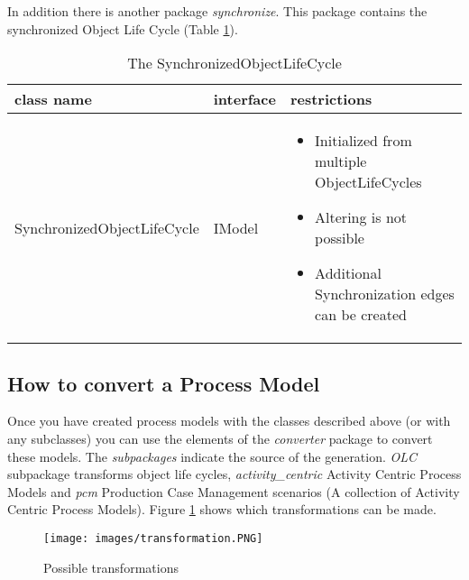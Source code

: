 In addition there is another package \textit{synchronize}. This package contains the synchronized Object Life Cycle (Table \ref{tbl:synchronize_olc}).

\begin{table}[h]
	\centering
	\begin{tabular}{|l|l|p{8cm}|}
		\hline
		\textbf{class name} & \textbf{interface} & \textbf{restrictions}\\
		\hline
		SynchronizedObjectLifeCycle & IModel & \begin{itemize}
					\item Initialized from multiple ObjectLifeCycles
					\item Altering is not possible
					\item Additional Synchronization edges can be created
				\end{itemize}\\
		\hline
	\end{tabular}
	\caption{The SynchronizedObjectLifeCycle}
	\label{tbl:synchronize_olc}
\end{table}

\subsection{How to convert a Process Model}

Once you have created process models with the classes described above (or with any subclasses) you can use the elements of the \textit{converter} package to convert these models.
The \textit{subpackages} indicate the source of the generation.
\textit{OLC} subpackage transforms object life cycles, \textit{activity\_centric} Activity Centric Process Models and \textit{pcm} Production Case Management scenarios (A collection of Activity Centric Process Models).
Figure \ref{fig:transformations} shows which transformations can be made.
\begin{figure}[h]
\centering
\texttt{[image: images/transformation.PNG]}
\caption{Possible transformations}
\label{fig:transformations}
\end{figure}